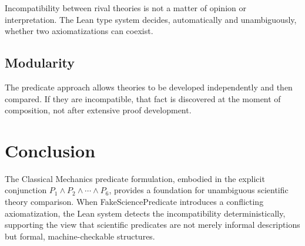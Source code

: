 \documentclass[11pt]{article}
\begin{document}
Incompatibility between rival theories is not a matter of opinion or
interpretation. The Lean type system decides, automatically and unambiguously,
whether two axiomatizations can coexist.

\subsection{Modularity}

The predicate approach allows theories to be developed independently and then
compared. If they are incompatible, that fact is discovered at the moment of
composition, not after extensive proof development.

\section{Conclusion}

The Classical Mechanics predicate formulation, embodied in the explicit
conjunction $P_1 \land P_2 \land \cdots \land P_6$, provides a foundation for
unambiguous scientific theory comparison. When FakeSciencePredicate introduces
a conflicting axiomatization, the Lean system detects the incompatibility
deterministically, supporting the view that scientific predicates are not
merely informal descriptions but formal, machine-checkable structures.



\end{document}
